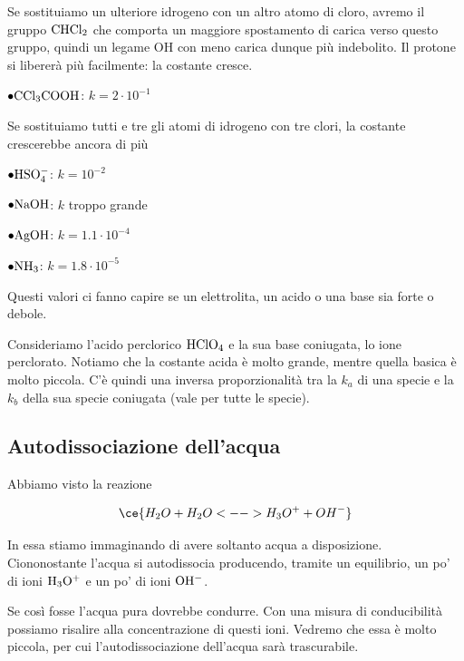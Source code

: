 \vspace{0.2cm}Se sostituiamo un ulteriore idrogeno con un altro atomo di cloro, avremo il gruppo $\rm CHCl_2$ che comporta un maggiore spostamento di carica verso questo gruppo, quindi un legame OH con meno carica dunque più indebolito. Il protone si libererà più facilmente: la costante cresce.

\vspace{0.2cm}$\bullet \rm CCl_3COOH$: $k=2 \cdot 10^{-1}$

\vspace{0.2cm}Se sostituiamo tutti e tre gli atomi di idrogeno con tre clori, la costante crescerebbe ancora di più

\vspace{0.2cm}$\bullet \rm HSO_4^-$: $k=10^{-2}$

\vspace{0.2cm}$\bullet \rm NaOH$: $k$ troppo grande

\vspace{0.2cm}$\bullet \rm AgOH$: $k=1.1 \cdot 10^{-4}$

\vspace{0.2cm}$\bullet \rm NH_3$: $k=1.8 \cdot 10^{-5}$

\vspace{0.4cm}Questi valori ci fanno capire se un elettrolita, un acido o una base sia forte o debole.

Consideriamo l'acido perclorico $\rm HClO_4$ e la sua base coniugata, lo ione perclorato. Notiamo che la costante acida è molto grande, mentre quella basica è molto piccola. C'è quindi una inversa proporzionalità tra la $k_a$ di una specie e la $k_b$ della sua specie coniugata (vale per tutte le specie).
\newpage
\subsection{Autodissociazione dell'acqua}
Abbiamo visto la reazione

$$\ce{H_2O + H_2O <--> H_3O^+ + OH^-}$$

In essa stiamo immaginando di avere soltanto acqua a disposizione. Ciononostante l'acqua si autodissocia producendo, tramite un equilibrio, un po' di ioni $\rm H_3O^+$ e un po' di ioni $\rm OH^-$.

Se così fosse l'acqua pura dovrebbe condurre. Con una misura di conducibilità possiamo risalire alla concentrazione di questi ioni. Vedremo che essa è molto piccola, per cui l'autodissociazione dell'acqua sarà trascurabile.

